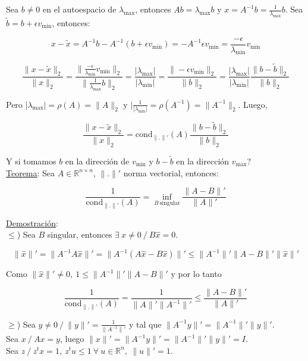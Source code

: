 Sea $b \neq 0$ en el autoespacio de $\lambda_{\max}$, entonces $Ab = \lambda_{\max}b$ y $x = A^{-1}b = \frac{1}{\lambda_{\max}}b$. Sea $\tilde{b} = b + \epsilon v_{\min}$, entonces:

$$x - \tilde{x} = A^{-1}b - A^{-1}(b + \epsilon v_{\min}) = -A^{-1}\epsilon v_{\min} = \frac{-\epsilon}{\lambda_{\min}}v_{\min}$$

$$\frac{\|x - \tilde{x}\|_{2}}{\|x\|_{2}} = \frac{\|\frac{-\epsilon}{\lambda_{\min}}v_{\min}\|_{2}}{\|\frac{1}{\lambda_{\max}}b\|_{2}} = \frac{|\lambda_{\max}|}{|\lambda_{\min}|} = \frac{\|-\epsilon v_{\min}\|_{2}}{\|b\|_{2}} = \frac{|\lambda_{\max}|}{|\lambda_{\min}|}\frac{\|b - \tilde{b}\|_{2}}{\|b\|_{2}}$$

Pero $|\lambda_{\max}| = \rho(A) = \|A\|_{2}$ y $|\frac{1}{|\lambda_{\min}|} = \rho(A^{-1}) = \|A^{-1}\|_{2}$. Luego,

$$\frac{\|x - \tilde{x}\|_{2}}{\|x\|_{2}} = \text{cond}_{\|.\|'}(A)\frac{\|b - \tilde{b}\|_{2}}{\|b\|_{2}}$$

Y si tomamos $b$ en la direcci\'on de $v_{\min}$ y $b - \tilde{b}$ en la direcci\'on $v_{\max}$?\\

\underline{Teorema}: Sea $A \in \mathbb{R}^{n \times n}$, $\|.\|'$ norma vectorial, entonces:

$$\frac{1}{\text{cond}_{\|.\|'}(A)} = \inf \limits_{B\  \text{singular}} \frac{\|A - B\|'}{\|A\|'}$$

\underline{Demostraci\'on}:\\

$\leq$) Sea $B$ singular, entonces $\exists \ \hat{x} \neq 0\ / \ B\hat{x} = 0$.

$$\|\hat{x}\|' = \|A^{-1}A\hat{x}\|' = \|A^{-1}(A\hat{x} - B\hat{x})\|' \leq \|A^{-1}\|'\|A - B\|'\|\hat{x}\|'$$

Como $\|\hat{x}\|' \neq 0,\ 1 \leq \|A^{-1}\|'\|A - B\|'$ y por lo tanto

$$\frac{1}{\text{cond}_{\|.\|'}(A)} = \frac{1}{\|A\|'\|A^{-1}\|'} \leq \frac{\|A - B\|'}{\|A\|'}$$

$\geq$) Sea $y \neq 0\ / \ \|y\|' = \frac{1}{\|A^{-1}\|'}$ y tal que $\|A^{-1}y\|' = \|A^{-1}\|'\|y\|'$.\\

Sea $x\ / \ Ax = y$, luego $\|x\|' = \|A^{-1}y\|' = \|A^{-1}\|'\|y\|' = I$.\\

Sea $z\ / \ z^{t}x = 1,\ z^{t}u \leq 1\ \forall \ u \in \mathbb{R}^{n},\ \|u\|' = 1$.\\

